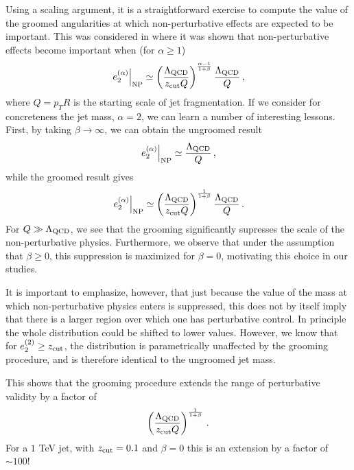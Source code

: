 Using a scaling argument, it is a straightforward exercise to compute the value of the groomed angularities at which non-perturbative effects are expected to be important. This was considered in  \cite{Frye:2016aiz,Dasgupta:2013ihk}
where it was shown that non-perturbative effects become important when (for $\alpha \geq 1$)
\begin{align}
\left. e_{2}^{(\alpha)} \right |_{\text{NP}} \simeq  \left( \frac{{\Lambda_\text{QCD}}}{z_{\rm cut} Q}  \right)^{\frac{\alpha-1}{1+\beta}}  \frac{{\Lambda_\text{QCD}}}{Q}\,,
\end{align}
\noindent where $Q=p_TR$ is the starting scale of jet fragmentation.  If we consider for concreteness the jet mass, $\alpha=2$, we can learn a number of interesting lessons. First, by taking $\beta\to \infty$, we can obtain the ungroomed result
\begin{align}
\left. e_{2}^{(\alpha)} \right |_{\text{NP}} \simeq  \frac{{\Lambda_\text{QCD}}}{Q}\,,
\end{align} 
while the groomed result gives 
\begin{align}
\left. e_{2}^{(\alpha)} \right |_{\text{NP}} \simeq  \left( \frac{{\Lambda_\text{QCD}}}{z_{\rm cut} Q}  \right)^{\frac{1}{1+\beta}}  \frac{{\Lambda_\text{QCD}}}{Q}\,.
\end{align}
For $Q\gg {\Lambda_\text{QCD}}$, we see that the grooming significantly supresses
the scale of the non-perturbative physics. Furthermore, we observe
that under the assumption that $\beta \geq 0$, this suppression is
maximized for $\beta=0$, motivating this choice in our
studies. 

It is important to emphasize, however, that just because the value of the mass at which non-perturbative physics enters is suppressed, this does not by itself imply that there is a larger region over which one has perturbative control. In principle the whole distribution could be shifted to lower values. However, we know that for $e_{2}^{(2)} \geq z_{\rm cut}$, the distribution is parametrically unaffected by the grooming procedure, and is therefore identical to the ungroomed jet mass. 

This shows that the grooming procedure extends the range of perturbative validity by a factor of 
\begin{align}
\left( \frac{{\Lambda_\text{QCD}}}{z_{\rm cut} Q}  \right)^{\frac{1}{1+\beta}} \,.
\end{align}
For a $1$ TeV jet, with $z_{\rm cut} =0.1$ and $\beta=0$ this is an extension by a factor of $\sim 100$!


